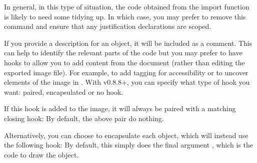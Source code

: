 \documentclass[fontsize=12pt]{scrbook}
\begin{document}
In general, in this type of situation, the code obtained from the
import function is likely to need some tidying up. In which case,
you may prefer to remove this command and ensure that any
justification declarations are scoped.

If you provide a description for an object, it will be included as a
comment. This can help to identify the relevant parts of the code
but you may prefer to have hooks to allow you to add content from
the document (rather than editing the exported image file). 
For example, to add tagging for accessibility or to
uncover elements of the image in . With 
v0.8.8+, you can specify what type of hook you want:
paired, encapsulated or no hook.

If this hook is added to the image, it will always be paired with a
matching closing hook:
By default, the above pair do nothing.

Alternatively, you can choose to encapsulate each object, which will
instead use the following hook:
By default, this simply does the final argument , which is the code
to draw the object.
\end{document}
